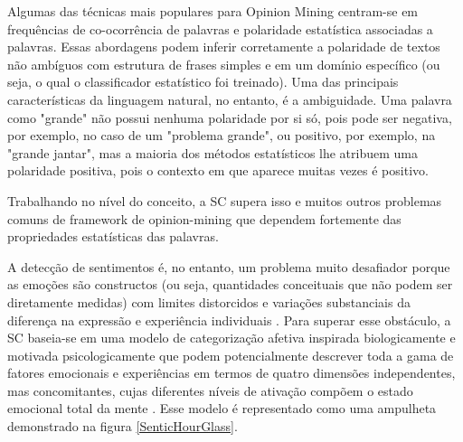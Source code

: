 \documentclass[
	12pt,				%
	openright,			%
	oneside,			%
	a4paper,			%
	english,			%
	spanish,			%
	brazil				%
	]{abntex2}
\begin{document}
Algumas das técnicas mais populares para Opinion Mining centram-se em frequências de co-ocorrência de palavras e polaridade estatística associadas a palavras. Essas abordagens podem inferir corretamente a polaridade de textos não ambíguos com estrutura de frases simples e em um domínio específico (ou seja, o qual o classificador estatístico foi treinado). Uma das principais características da linguagem natural, no entanto, é a ambiguidade. Uma palavra como "grande" não possui nenhuma polaridade por si só, pois pode ser negativa, por exemplo, no caso de um "problema grande", ou positivo, por exemplo, na "grande jantar", mas a maioria dos métodos estatísticos lhe atribuem uma polaridade positiva, pois o contexto em que aparece muitas vezes é positivo.

Trabalhando no nível do conceito, a SC supera isso e muitos outros problemas comuns de framework de opinion-mining que dependem fortemente das propriedades estatísticas das palavras. 

A detecção de sentimentos é, no entanto, um problema muito desafiador porque as emoções são constructos (ou seja, quantidades conceituais que não podem ser diretamente medidas) com limites distorcidos e variações substanciais da diferença na expressão e experiência individuais \cite{inBook_Bisio2016} . Para superar esse obstáculo, a SC baseia-se em uma modelo de categorização afetiva inspirada biologicamente e motivada psicologicamente que podem potencialmente descrever toda a gama de fatores emocionais e experiências em termos de quatro dimensões independentes, mas concomitantes, cujas diferentes níveis de ativação compõem o estado emocional total da mente \cite{book_Cambria2015}. Esse modelo é representado como uma ampulheta demonstrado na figura \ref{SenticHourGlass}.
\end{document}
